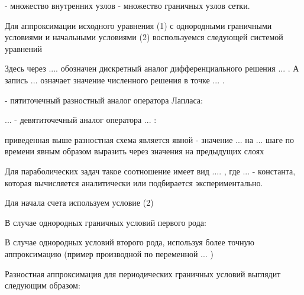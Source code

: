 \documentclass[12pt,a4paper]{scrartcl}
\begin{document}
 - множество внутренних узлов
 - множество граничных узлов сетки.

    Для аппроксимации исходного уравнения (1) с однородными граничными условиями и начальными условиями (2) воспользуемся следующей системой уравнений



Здесь через .... обозначен дискретный аналог дифференциального решения ... . А запись
... означает значение численного решения в точке ... .

 - пятиточечный разностный аналог оператора Лапласа:



... - девятиточечный аналог оператора ... :


приведенная выше разностная схема является явной - значение ... на ... шаге по времени явным образом выразить через значения на предыдущих слоях

Для параболических задач такое соотношение имеет вид .... , где ... - константа, которая вычисляется аналитически или подбирается экспериментально.

Для начала счета используем условие (2)


 В случае однородных граничных условий первого рода:

В случае однородных условий второго рода, используя более точную аппроксимацию (пример производной по переменной ... )




Разностная аппроксимация для периодических граничных условий выглядит следующим образом:
 

      
\end{document}
